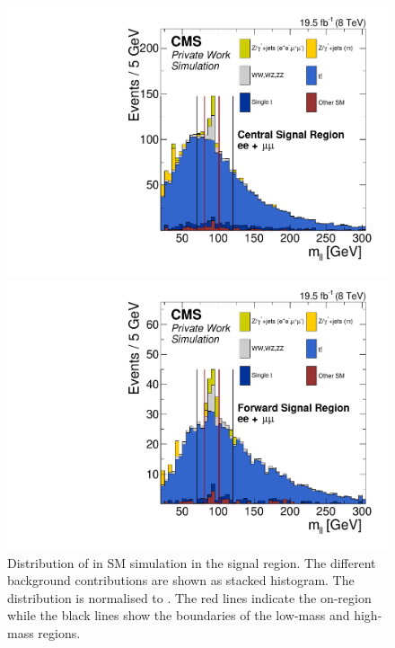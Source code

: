 \begin{figure}[htbp]
\centering
\begin{minipage}[t]{0.49\textwidth}
  \includegraphics[width=\textwidth]{plots/SELECTION/SignalCentral_Mll_Full2012_SF_TopReweighted_MCOnly.pdf}
\end{minipage}
\begin{minipage}[t]{0.49\textwidth}
\includegraphics[width=\textwidth]{plots/SELECTION/SignalForward_Mll_Full2012_SF_TopReweighted_MCOnly.pdf}
\end{minipage}
\caption{Distribution of \mll in SM simulation in the signal region. The different background contributions are shown as stacked histogram. The distribution is normalised to \lumi. The red lines indicate the on-\Z region while the black lines show the boundaries of the low-mass and high-mass regions.}
\label{fig:sigMC}
\end{figure}

